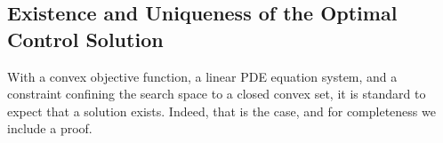 \documentclass{article}
\newtheorem{theorem}{Theorem}[section]
\begin{document}
\subsection{Existence and Uniqueness of the Optimal Control Solution}

With a convex objective function, a linear PDE equation system, and a constraint confining the search space to a closed convex set,
it is standard to expect that a solution exists. Indeed, that is the case, and for completeness we include a proof.



    
\end{document}
